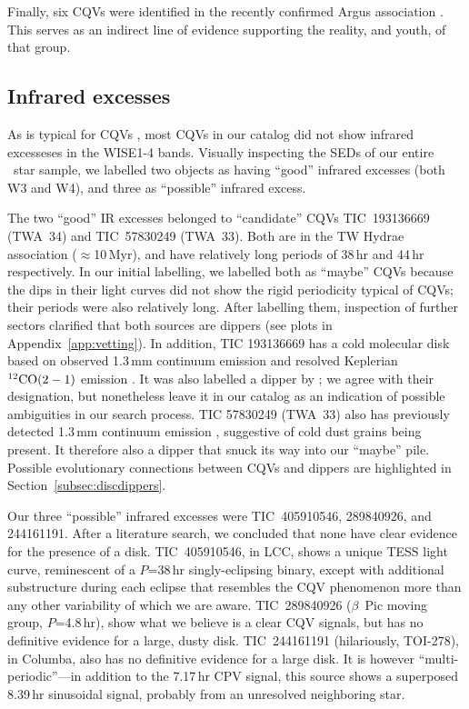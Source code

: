 \documentclass[11pt,twocolumn,tighten]{aastex63}
\begin{document}
Finally, six CQVs were identified in the recently confirmed Argus
association \citep{2019ApJ...870...27Z}.  This serves as an indirect
line of evidence supporting the reality, and youth, of that group.


\subsection{Infrared excesses}
\label{subsec:irexcess}

As is typical for CQVs \citep{2017AJ....153..152S}, most CQVs in our
catalog did not show infrared excesseses in the WISE1-4 bands.
Visually inspecting the SEDs of our entire \ncpvsfound\ star sample,
we labelled two objects as having ``good'' infrared excesses (both W3
and W4), and three as ``possible'' infrared excess.

The two ``good'' IR excesses belonged to ``candidate'' CQVs
TIC~193136669 (TWA~34) and TIC~57830249 (TWA~33).  Both are in the TW
Hydrae association ($\approx$10\,Myr), and have relatively long
periods of 38\,hr and 44\,hr respectively.  In our initial labelling,
we labelled both as ``maybe'' CQVs because the dips in their light
curves did not show the rigid periodicity typical of CQVs;  their
periods were also relatively long.  After labelling them, inspection
of further sectors clarified that both sources are dippers (see plots
in Appendix~\ref{app:vetting}).  In addition, TIC 193136669 has a cold
molecular disk based on observed 1.3\,mm continuum emission and
resolved Keplerian $^{12}{\rm CO}(2-1)$ emission
\citep{2015A&A...582L...5R}.  It was also labelled a dipper by
\citet{2022ApJS..263...14C}; we agree with their designation, but
nonetheless leave it in our catalog as an indication of possible
ambiguities in our search process.  TIC 57830249 (TWA~33) also has
previously detected 1.3\,mm continuum emission
\citep{2015A&A...582L...5R}, suggestive of cold dust grains being
present.  It therefore also a dipper that snuck its way into our
``maybe'' pile.
Possible evolutionary connections between CQVs and dippers are
highlighted in Section~\ref{subsec:discdippers}.

Our three ``possible'' infrared excesses were TIC~405910546,
289840926, and 244161191.  After a literature search, we concluded
that none have clear evidence for the presence of a disk.
TIC~405910546, in LCC, shows a unique TESS light curve, reminescent of
a $P$=38\,hr singly-eclipsing binary, except with additional
substructure during each eclipse that resembles the CQV phenomenon
more than any other variability of which we are aware.  TIC~289840926
($\beta$~Pic moving group, $P$=4.8\,hr), show what we believe is a
clear CQV signals, but has no definitive evidence for a large, dusty
disk.  TIC~244161191 (hilariously, TOI-278), in Columba, also has no
definitive evidence for a large disk.  It is however
``multi-periodic''---in addition to the 7.17\,hr CPV signal, this
source shows a superposed 8.39\,hr sinusoidal signal, probably from an
unresolved neighboring star.
\end{document}
